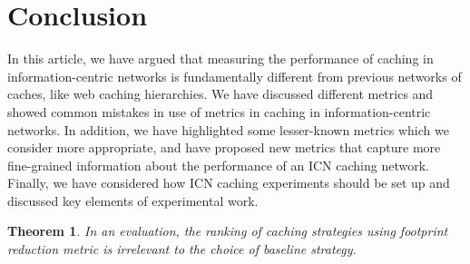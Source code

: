 \documentclass{sigcomm-alternate}
\newtheorem{mythm}{Theorem}
\begin{document}
\section{Conclusion}
\label{sec:conclusion}

In this article, we have argued that measuring the performance of caching in information-centric networks is fundamentally different from previous networks of caches, like web caching hierarchies.
We have discussed different metrics and showed common mistakes in use of metrics in caching in information-centric networks.
In addition, we have highlighted some lesser-known metrics which we consider more appropriate, and have proposed new metrics that capture more fine-grained information about the performance of an ICN caching network.
Finally, we have considered how ICN caching experiments should be set up and discussed key elements of experimental work.






\appendix
\begin{mythm}
In an evaluation, the ranking of caching strategies using footprint reduction metric is irrelevant to the choice of baseline strategy.
\end{mythm}
\end{document}
